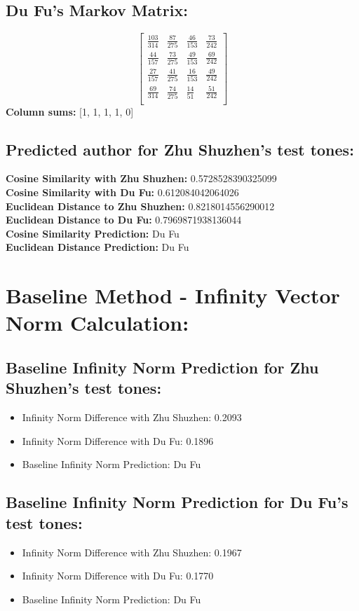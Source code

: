 \documentclass[12pt]{article}
\begin{document}
\subsection*{Du Fu's Markov Matrix:}
\[
\begin{bmatrix}
    \frac{103}{314} & \frac{87}{275} & \frac{46}{153} & \frac{73}{242} \\
    \frac{44}{157} & \frac{73}{275} & \frac{49}{153} & \frac{69}{242} \\
    \frac{27}{157} & \frac{41}{275} & \frac{16}{153} & \frac{49}{242}  \\
    \frac{69}{314} & \frac{74}{275} & \frac{14}{51} & \frac{51}{242}  \\
\end{bmatrix}
\]
\textbf{Column sums:} [1, 1, 1, 1, 0]

\subsection*{Predicted author for Zhu Shuzhen's test tones:}
\textbf{Cosine Similarity with Zhu Shuzhen:} 0.5728528390325099
\\
\textbf{Cosine Similarity with Du Fu:} 0.612084042064026
\\
\textbf{Euclidean Distance to Zhu Shuzhen:} 0.8218014556290012
\\
\textbf{Euclidean Distance to Du Fu:} 0.7969871938136044
\\
\textbf{Cosine Similarity Prediction:} Du Fu
\\
\textbf{Euclidean Distance Prediction:} Du Fu

\section*{Baseline Method - Infinity Vector Norm Calculation: }
\subsection*{Baseline Infinity Norm Prediction for Zhu Shuzhen's test tones:}

\begin{itemize}
    \item Infinity Norm Difference with Zhu Shuzhen: 0.2093
    \item Infinity Norm Difference with Du Fu: 0.1896
    \item Baseline Infinity Norm Prediction: Du Fu
\end{itemize}

\subsection*{Baseline Infinity Norm Prediction for Du Fu's test tones:}

\begin{itemize}
    \item Infinity Norm Difference with Zhu Shuzhen: 0.1967
    \item Infinity Norm Difference with Du Fu: 0.1770
    \item Baseline Infinity Norm Prediction: Du Fu
\end{itemize}
\end{document}
